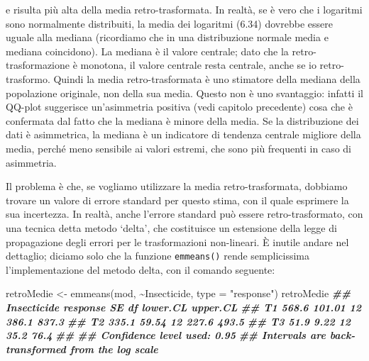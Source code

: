 \documentclass[
  12pt,
]{book}
\newenvironment{Shaded}{\begin{snugshade}}{\end{snugshade}}
\newcommand{\AttributeTok}[1]{\textcolor[rgb]{0.77,0.63,0.00}{#1}}
\newcommand{\DocumentationTok}[1]{\textcolor[rgb]{0.56,0.35,0.01}{\textbf{\textit{#1}}}}
\newcommand{\FunctionTok}[1]{\textcolor[rgb]{0.00,0.00,0.00}{#1}}
\newcommand{\NormalTok}[1]{#1}
\newcommand{\OtherTok}[1]{\textcolor[rgb]{0.56,0.35,0.01}{#1}}
\newcommand{\SpecialCharTok}[1]{\textcolor[rgb]{0.00,0.00,0.00}{#1}}
\newcommand{\StringTok}[1]{\textcolor[rgb]{0.31,0.60,0.02}{#1}}
\begin{document}
\begin{Shaded}
\end{Shaded}

e risulta più alta della media retro-trasformata. In realtà, se è vero che i logaritmi sono normalmente distribuiti, la media dei logaritmi (6.34) dovrebbe essere uguale alla mediana (ricordiamo che in una distribuzione normale media e mediana coincidono). La mediana è il valore centrale; dato che la retro-trasformazione è monotona, il valore centrale resta centrale, anche se io retro-trasformo. Quindi la media retro-trasformata è uno stimatore della mediana della popolazione originale, non della sua media. Questo non è uno svantaggio: infatti il QQ-plot suggerisce un'asimmetria positiva (vedi capitolo precedente) cosa che è confermata dal fatto che la mediana è minore della media. Se la distribuzione dei dati è asimmetrica, la mediana è un indicatore di tendenza centrale migliore della media, perché meno sensibile ai valori estremi, che sono più frequenti in caso di asimmetria.

Il problema è che, se vogliamo utilizzare la media retro-trasformata, dobbiamo trovare un valore di errore standard per questo stima, con il quale esprimere la sua incertezza. In realtà, anche l'errore standard può essere retro-trasformato, con una tecnica detta metodo `delta', che costituisce un estensione della legge di propagazione degli errori per le trasformazioni non-lineari. È inutile andare nel dettaglio; diciamo solo che la funzione \texttt{emmeans()} rende semplicissima l'implementazione del metodo delta, con il comando seguente:

\begin{Shaded}
\begin{Highlighting}[]
\NormalTok{retroMedie }\OtherTok{\textless{}{-}} \FunctionTok{emmeans}\NormalTok{(mod, }\SpecialCharTok{\textasciitilde{}}\NormalTok{Insecticide, }\AttributeTok{type =} \StringTok{"response"}\NormalTok{)}
\NormalTok{retroMedie}
\DocumentationTok{\#\#  Insecticide response     SE df lower.CL upper.CL}
\DocumentationTok{\#\#  T1             568.6 101.01 12    386.1    837.3}
\DocumentationTok{\#\#  T2             335.1  59.54 12    227.6    493.5}
\DocumentationTok{\#\#  T3              51.9   9.22 12     35.2     76.4}
\DocumentationTok{\#\# }
\DocumentationTok{\#\# Confidence level used: 0.95 }
\DocumentationTok{\#\# Intervals are back{-}transformed from the log scale}
\end{Highlighting}
\end{Shaded}
\end{document}
